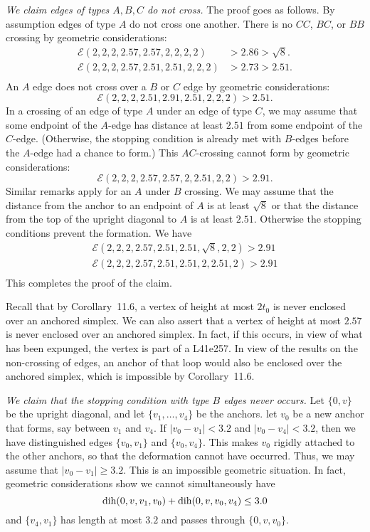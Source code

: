 \documentclass[11pt]{amsart}
\def\op#1{{\text{#1}}}
\newcommand{\mc}[1]{{\mathcal{#1}}}
\def\text{\hbox}
\begin{document}
{\it We claim edges of types $A,B,C$ do not cross.}
The proof goes as follows.
By assumption edges of type $A$ do not cross one another.
There is no $CC$, $BC$, or $BB$ crossing by geometric considerations:
   $$
   \begin{array}{lll}
   \mc{E}(2,2,2,2.57,2.57,2,2,2,2) &> 2.86 > \sqrt8.\\
   \mc{E}(2,2,2,2.57,2.51,2.51,2,2,2) &> 2.73 > 2.51.\\
   \end{array}
   $$
An $A$ edge does not cross over a $B$ or $C$ edge by geometric considerations:
   $$
   \mc{E}(2,2,2,2.51,2.91,2.51,2,2,2) > 2.51.
   $$
In a crossing of an edge of type $A$ under an edge of type $C$, we
may assume that some endpoint of the $A$-edge has distance at least $2.51$
from some endpoint of the $C$-edge.  (Otherwise, the stopping condition
is already met with $B$-edges before the $A$-edge had a chance to form.)
This $AC$-crossing cannot form by geometric considerations:
   $$
   \mc{E}(2,2,2,2.57,2.57,2,2.51,2,2) > 2.91.
   $$
Similar remarks apply for an $A$ under $B$ crossing.  We may assume that
the distance from the anchor to an endpoint of $A$ is at least $\sqrt8$
or that the distance from the top of the upright diagonal to $A$ is
at least $2.51$.  Otherwise the stopping conditions prevent the formation.
We have
   $$
   \begin{array}{lll}
   \mc{E}(2,2,2,2.57,2.51,2.51,\sqrt8,2,2) > 2.91\\
   \mc{E}(2,2,2,2.57,2.51,2.51,2,2.51,2) > 2.91\\
   \end{array}
   $$
This completes the proof of the claim.

Recall that by Corollary~11.6, a vertex of height at most $2t_0$ is
never enclosed over an anchored simplex.  We can also assert that
a vertex of height at most $2.57$ is never enclosed over an anchored
simplex.  In fact, if this occurs, in view of what has been expunged,
the vertex is part of a L41e257.  In view of the results on the non-crossing
of edges, an anchor of that loop  would also be enclosed over the
anchored simplex, which is impossible by Corollary~11.6.

{\it We claim that the stopping condition with type
$B$ edges never occurs.}  Let $\{0,v\}$ be the upright diagonal, and let $\{v_1,\ldots,v_4\}$ be the anchors.  let $v_0$ be a new anchor that forms, say between $v_1$ and $v_4$.  If $|v_0-v_1|< 3.2$ and $|v_0-v_4|<3.2$, then we have distinguished edges $\{v_0,v_1\}$ and $\{v_0,v_4\}$.  This makes $v_0$ rigidly attached to the other anchors, so that the deformation cannot have occurred.  Thus, we may assume that $|v_0-v_1|\ge 3.2$.  This is an impossible geometric situation.  In fact, geometric considerations show we cannot simultaneously have
  $$
  \op{dih}(0,v,v_1,v_0) + \op{dih}(0,v,v_0,v_4)\le 3.0
  $$
and $\{v_4,v_1\}$ has length at most $3.2$ and passes through $\{0,v,v_0\}$.  
\end{document}
